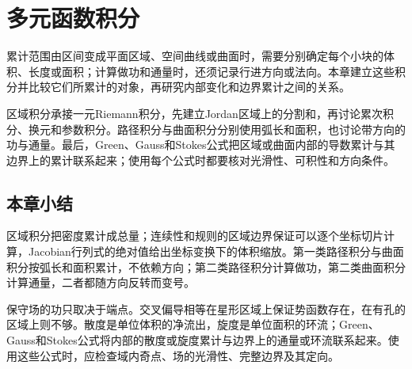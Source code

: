 \chapter{多元函数积分}
\label{chap:multivariate-integration}

累计范围由区间变成平面区域、空间曲线或曲面时，需要分别确定每个小块的体积、长度或面积；计算做功和通量时，还须记录行进方向或法向。本章建立这些积分并比较它们所累计的对象，再研究内部变化和边界累计之间的关系。

区域积分承接一元Riemann积分，先建立Jordan区域上的分割和，再讨论累次积分、换元和参数积分。路径积分与曲面积分分别使用弧长和面积，也讨论带方向的功与通量。最后，Green、Gauss和Stokes公式把区域或曲面内部的导数累计与其边界上的累计联系起来；使用每个公式时都要核对光滑性、可积性和方向条件。






\FloatBarrier
\section{本章小结}
\label{sec:multivariable-summary}

区域积分把密度累计成总量；连续性和规则的区域边界保证可以逐个坐标切片计算，Jacobian行列式的绝对值给出坐标变换下的体积缩放。第一类路径积分与曲面积分按弧长和面积累计，不依赖方向；第二类路径积分计算做功，第二类曲面积分计算通量，二者都随方向反转而变号。

保守场的功只取决于端点。交叉偏导相等在星形区域上保证势函数存在，在有孔的区域上则不够。散度是单位体积的净流出，旋度是单位面积的环流；Green、Gauss和Stokes公式将内部的散度或旋度累计与边界上的通量或环流联系起来。使用这些公式时，应检查域内奇点、场的光滑性、完整边界及其定向。
